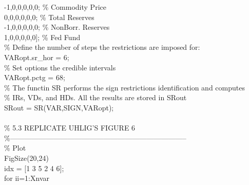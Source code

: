 \hspace{1mm}-1,0,0,0,0,0;  \textcolor{matlabgreen}{\% Commodity Price }\\ 
\hspace{1mm}0,0,0,0,0,0;  \textcolor{matlabgreen}{\% Total Reserves }\\ 
\hspace{1mm}-1,0,0,0,0,0;  \textcolor{matlabgreen}{\% NonBorr. Reserves }\\ 
\hspace{1mm}1,0,0,0,0,0]; \textcolor{matlabgreen}{\% Fed Fund }\\ 
\hspace{1mm}\textcolor{matlabgreen}{\% Define the number of steps the restrictions are imposed for: }\\ 
\hspace{1mm}VARopt.sr\_hor = 6; \\ 
\hspace{1mm}\textcolor{matlabgreen}{\% Set options the credible intervals }\\ 
\hspace{1mm}VARopt.pctg = 68; \\ 
\hspace{1mm}\textcolor{matlabgreen}{\% The functin SR performs the sign restrictions identification and computes }\\ 
\hspace{1mm}\textcolor{matlabgreen}{\% IRs, VDs, and HDs. All the results are stored in SRout }\\ 
\hspace{1mm}SRout = SR(VAR,SIGN,VARopt); \\ 
\hspace{1mm} \\ 
\hspace{1mm}\textcolor{matlabgreen}{\% 5.3 REPLICATE UHLIG'S FIGURE 6 }\\ 
\hspace{1mm}\textcolor{matlabgreen}{\%--------------------------------------------------------------------------  }\\ 
\hspace{1mm}\textcolor{matlabgreen}{\% Plot }\\ 
\hspace{1mm}FigSize(20,24) \\ 
\hspace{1mm}idx = [1 3 5 2 4 6]; \\ 
\hspace{1mm}\textcolor{matlabblue}{for} ii=1:Xnvar \\ 
